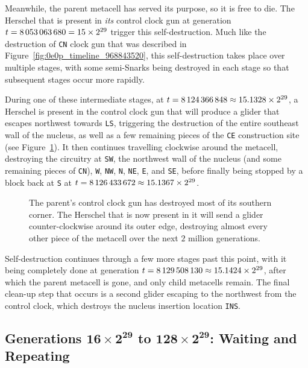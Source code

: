 Meanwhile, the parent metacell has served its purpose, so it is free to die. The Herschel that is present in \emph{its} control clock gun at generation $t = 8{\,}053{\,}063{\,}680 = 15 \times 2^{29}$ trigger this self-destruction. Much like the destruction of \texttt{CN} clock gun that was described in Figure~\ref{fig:0e0p_timeline_968843520}, this self-destruction takes place over multiple stages, with some semi-Snarks being destroyed in each stage so that subsequent stages occur more rapidly.

During one of these intermediate stages, at $t = 8{\,}124{\,}366{\,}848 \approx 15.1328 \times 2^{29}$, a Herschel is present in the control clock gun that will produce a glider that escapes northwest towards \texttt{LS}, triggering the destruction of the entire southeast wall of the nucleus, as well as a few remaining pieces of the \texttt{CE} construction site (see Figure~\ref{fig:0e0p_timeline_8124366848}). It then continues travelling clockwise around the metacell, destroying the circuitry at \texttt{SW}, the northwest wall of the nucleus (and some remaining pieces of \texttt{CN}), \texttt{W}, \texttt{NW}, \texttt{N}, \texttt{NE}, \texttt{E}, and \texttt{SE}, before finally being stopped by a block back at \texttt{S} at $t = 8{\,}126{\,}433{\,}672 \approx 15.1367 \times 2^{29}$.

\begin{figure}[!htb]
	\centering
	\caption{The parent's control clock gun has destroyed most of its southern corner. The Herschel that is now present in it will send a glider counter-clockwise around its outer edge, destroying almost every other piece of the metacell over the next $2$ million generations.}
	\label{fig:0e0p_timeline_8124366848}
\end{figure}

Self-destruction continues through a few more stages past this point, with it being completely done at generation $t = 8{\,}129{\,}508{\,}130 \approx 15.1424 \times 2^{29}$, after which the parent metacell is gone, and only child metacells remain. The final clean-up step that occurs is a second glider escaping to the northwest from the control clock, which destroys the nucleus insertion location \texttt{INS}.


\subsection{Generations $\mathbf{16 \times 2^{29}}$ to $\mathbf{128 \times 2^{29}}$: Waiting and Repeating}\label{sec:0e0p_timeline_wait_repeat}

